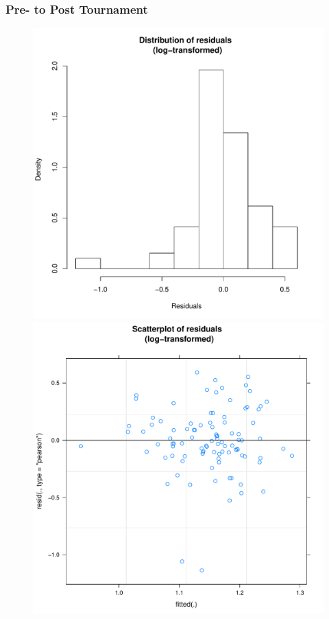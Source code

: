 \begin{CJK}{UTF8}{gbsn}
      \subsubsection{Pre- to Post Tournament\label{app8:prediction2bPrePost}}


      \begin{figure}[htbp]
        \includegraphics[scale =.4]{images/MLM23bLogHist.pdf}
        \includegraphics[scale =.4]{images/MLM23bLogScatter.pdf}

\end{figure}
\end{CJK}
